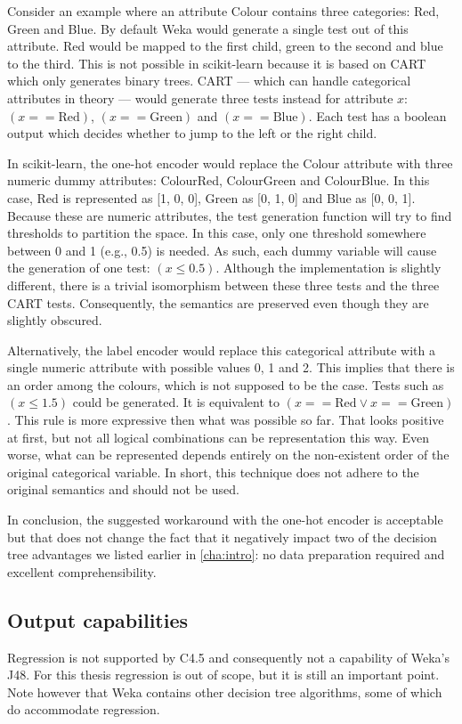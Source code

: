 Consider an example where an attribute Colour contains three categories: Red, Green and Blue. By default Weka would generate a single test out of this attribute. Red would be mapped to the first child, green to the second and blue to the third. This is not possible in scikit-learn because it is based on CART which only generates binary trees. CART --- which can handle categorical attributes in theory --- would generate three tests instead for attribute $x$: $(x == \text{Red})$, $(x == \text{Green})$ and $(x == \text{Blue})$. Each test has a boolean output which decides whether to jump to the left or the right child. 

In scikit-learn, the one-hot encoder would replace the Colour attribute with three numeric dummy attributes: ColourRed, ColourGreen and ColourBlue. In this case, Red is represented as [1, 0, 0], Green as [0, 1, 0] and Blue as [0, 0, 1]. Because these are numeric attributes, the test generation function will try to find thresholds to partition the space. In this case, only one threshold somewhere between 0 and 1 (e.g., 0.5) is needed. As such, each dummy variable will cause the generation of one test: $(x \leqslant 0.5)$. Although the implementation is slightly different, there is a trivial isomorphism between these three tests and the three CART tests. Consequently, the semantics are preserved even though they are slightly obscured.

Alternatively, the label encoder would replace this categorical attribute with a single numeric attribute with possible values 0, 1 and 2. This implies that there is an order among the colours, which is not supposed to be the case. Tests such as $(x \leqslant 1.5)$ could be generated. It is equivalent to $(x == \text{Red} \lor x == \text{Green})$. This rule is more expressive then what was possible so far. That looks positive at first, but not all logical combinations can be representation this way. Even worse, what can be represented depends entirely on the non-existent order of the original categorical variable. In short, this technique does not adhere to the original semantics and should not be used.

In conclusion, the suggested workaround with the one-hot encoder is acceptable but that does not change the fact that it negatively impact two of the decision tree advantages we listed earlier in \autoref{cha:intro}: no data preparation required and excellent comprehensibility.


\subsection{Output capabilities}
Regression is not supported by C4.5 and consequently not a capability of Weka's J48. For this thesis regression is out of scope, but it is still an important point. Note however that Weka contains other decision tree algorithms, some of which do accommodate regression.

